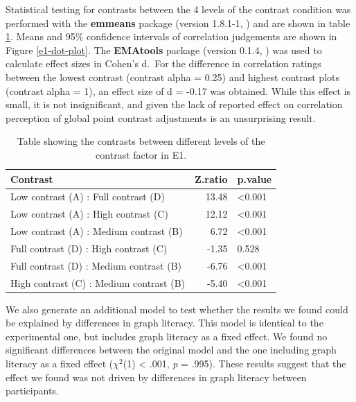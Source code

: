 \documentclass[preprint, 3p,
authoryear]{elsarticle} %
\begin{document}
Statistical testing for contrasts between the 4 levels of the contrast
condition was performed with the \textbf{emmeans} package (version
1.8.1-1, \citealp{emmeans}) and are shown in table
\ref{contrasts-table-e1}. Means and 95\% confidence intervals of
correlation judgements are shown in Figure \ref{e1-dot-plot}. The
\textbf{EMAtools} package (version 0.1.4, \citealp{ematools}) was used
to calculate effect sizes in Cohen's d.~For the difference in
correlation ratings between the lowest contrast (contrast alpha = 0.25)
and highest contrast plots (contrast alpha = 1), an effect size of d =
-0.17 was obtained. While this effect is small, it is not insignificant,
and given the lack of reported effect on correlation perception of
global point contrast adjustments \citep{rensink_2012} is an
unsurprising result.

\begin{table}

\caption{\label{tab:contrasts-table-e1}\label{contrasts-table-e1}Table showing the contrasts between different levels of the contrast factor in E1.}
\centering
\begin{tabular}[t]{lrl}
\toprule
Contrast & Z.ratio & p.value\\
\midrule
Low contrast (A) : Full contrast (D) & 13.48 & <0.001\\
Low contrast (A) : High contrast (C) & 12.12 & <0.001\\
Low contrast (A) : Medium contrast (B) & 6.72 & <0.001\\
Full contrast (D) : High contrast (C) & -1.35 & 0.528\\
Full contrast (D) : Medium contrast (B) & -6.76 & <0.001\\
\addlinespace
High contrast (C) : Medium contrast (B) & -5.40 & <0.001\\
\bottomrule
\end{tabular}
\end{table}

We also generate an additional model to test whether the results we
found could be explained by differences in graph literacy. This model is
identical to the experimental one, but includes graph literacy as a
fixed effect. We found no significant differences between the original
model and the one including graph literacy as a fixed effect
(\(\chi^2\)(1) \textless{} .001, \emph{p} = .995). These results suggest
that the effect we found was not driven by differences in graph literacy
between participants.
\end{document}
